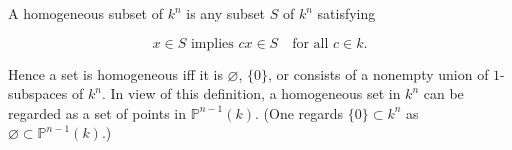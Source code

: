 A homogeneous subset of $k^n$ is any subset $S$ of $k^n$ satisfying

$$x \in S \text{ implies } cx \in S \quad \text{for all } c \in k.$$

Hence a set is homogeneous iff it is $\varnothing$, $\{0\}$, or consists of a nonempty union of $1$-subspaces of $k^n$. In view of this definition, a homogeneous set in $k^n$ can be regarded as a set of points in $\mathbb{P}^{n-1}(k)$. (One regards $\{0\} \subset k^n$ as $\varnothing \subset \mathbb{P}^{n-1}(k)$.)
